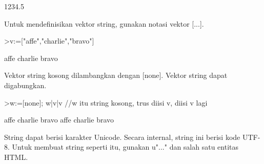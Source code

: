 \documentclass[a4paper,10pt]{article}
\begin{document}
\begin{eulernotebook}
\begin{euleroutput}
  1234.5
\end{euleroutput}
\begin{eulercomment}
Untuk mendefinisikan vektor string, gunakan notasi vektor [...].
\end{eulercomment}
\begin{eulerprompt}
>v:=["affe","charlie","bravo"]
\end{eulerprompt}
\begin{euleroutput}
  affe
  charlie
  bravo
\end{euleroutput}
\begin{eulercomment}
Vektor string kosong dilambangkan dengan [none]. Vektor string dapat
digabungkan.
\end{eulercomment}
\begin{eulerprompt}
>w:=[none]; w|v|v //w itu string kosong, trus diisi v, diisi v lagi
\end{eulerprompt}
\begin{euleroutput}
  affe
  charlie
  bravo
  affe
  charlie
  bravo
\end{euleroutput}
\begin{eulercomment}
String dapat berisi karakter Unicode. Secara internal, string ini
berisi kode UTF-8. Untuk membuat string seperti itu, gunakan u"..."
dan salah satu entitas HTML.


\end{eulercomment}
\end{eulernotebook}
\end{document}
